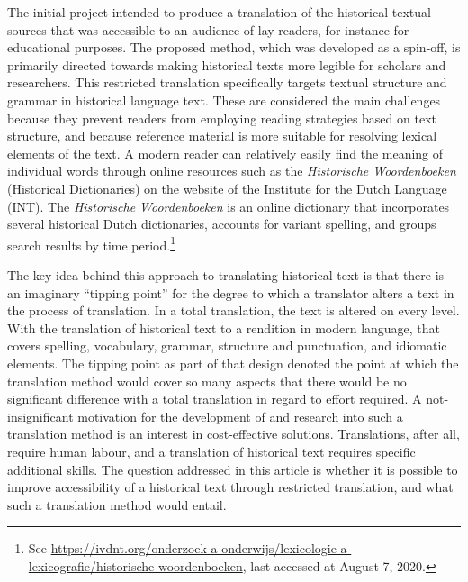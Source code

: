 \begin{paper}
\noindent The initial project intended to produce a translation of the historical
textual sources that was accessible to an audience of lay readers, for
instance for educational purposes. The proposed method, which was
developed as a spin-off, is primarily directed towards making historical
texts more legible for scholars and researchers. This restricted
translation specifically targets textual structure and grammar in
historical language text. These are considered the main challenges
because they prevent readers from employing reading strategies based on
text structure, and because reference material is more suitable for
resolving lexical elements of the text. A modern reader can relatively
easily find the meaning of individual words through online resources
such as the \emph{Historische Woordenboeken} (Historical Dictionaries) on the website of the
Institute for the Dutch Language (INT). The \emph{Historische Woordenboeken} is an online dictionary that incorporates several historical Dutch dictionaries, accounts for variant spelling, and groups search results by time period.\footnote{See \url{https://ivdnt.org/onderzoek-a-onderwijs/lexicologie-a-lexicografie/historische-woordenboeken}, last accessed at August 7, 2020.}

The key idea behind this approach to translating historical text is that
there is an imaginary ``tipping point'' for the degree to which a
translator alters a text in the process of translation. In a total
translation, the text is altered on every level. With the translation of
historical text to a rendition in modern language, that covers spelling,
vocabulary, grammar, structure and punctuation, and idiomatic elements.
The tipping point as part of that design denoted the point at which
the translation method would cover so many aspects that there would be
no significant difference with a total translation in regard to effort
required. A not-insignificant motivation for the development of and
research into such a translation method is an interest in cost-effective
solutions. Translations, after all, require human labour, and a
translation of historical text requires specific additional skills. The
question addressed in this article is whether it is possible to improve
accessibility of a historical text through restricted translation, and
what such a translation method would entail.


\end{paper}
